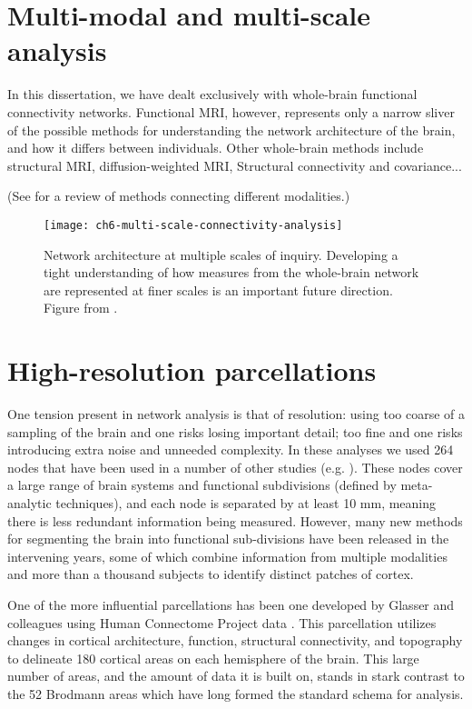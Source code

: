 \section{Multi-modal and multi-scale analysis}

In this dissertation, we have dealt exclusively with whole-brain functional connectivity networks. Functional MRI, however, represents only a narrow sliver of the possible methods for understanding the network architecture of the brain, and how it differs between individuals. Other whole-brain methods include structural MRI, diffusion-weighted MRI, Structural connectivity and covariance... 

(See \citep{Sui2012} for a review of methods connecting different modalities.)

\begin{figure}[t]
	\centering
	\texttt{[image: ch6-multi-scale-connectivity-analysis]}
	\caption[Network architecture at multiple scales.]{Network architecture at multiple scales of inquiry. Developing a tight understanding of how measures from the whole-brain network are represented at finer scales is an important future direction. Figure from \citep{Petersen2015}.}
	\label{fig:ch6-multi-scale-connectivity-analysis}
\end{figure}


\section{High-resolution parcellations}

One tension present in network analysis is that of resolution: using too coarse of a sampling of the brain and one risks losing important detail; too fine and one risks introducing extra noise and unneeded complexity. In these analyses we used 264 nodes that have been used in a number of other studies (e.g. \citep{Power2013, Cole2014}). These nodes cover a large range of brain systems and functional subdivisions (defined by meta-analytic techniques), and each node is separated by at least 10 mm, meaning there is less redundant information being measured. However, many new methods for segmenting the brain into functional sub-divisions have been released in the intervening years, some of which combine information from multiple modalities and more than a thousand subjects to identify distinct patches of cortex. 

One of the more influential parcellations has been one developed by Glasser and colleagues using Human Connectome Project data \citep{Glasser2016}. This parcellation utilizes changes in cortical architecture, function, structural connectivity, and topography to delineate 180 cortical areas on each hemisphere of the brain. This large number of areas, and the amount of data it is built on, stands in stark contrast to the 52 Brodmann areas which have long formed the standard schema for analysis. 

